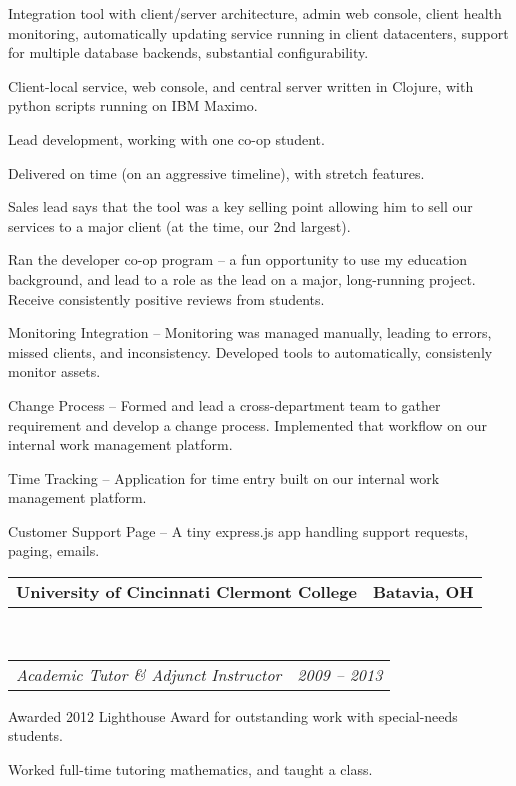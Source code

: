 \documentclass[10pt,letterpaper]{article}
\makeatletter
\newcommand{\headerrow}[2]
{\begin{tabular*}{\linewidth}{l@{\extracolsep{\fill}}r}
	#1 &
	#2 \\
\end{tabular*}}
\makeatother
\begin{document}
\begin{itemize*}
          \begin{itemize*}
          \item Integration tool with client/server architecture, admin web console, client health monitoring, automatically updating service running in client datacenters, support for multiple database backends, substantial configurability.
          \item Client-local service, web console, and central server written in Clojure, with python scripts running on IBM Maximo.
          \item Lead development, working with one co-op student.
          \item Delivered on time (on an aggressive timeline), with stretch features.
          \item Sales lead says that the tool was a key selling point allowing him to sell our services to a major client (at the time, our 2nd largest).
          \end{itemize*}

          \item Ran the developer co-op program -- a fun opportunity to use my education background, and lead to a role as the lead on a major, long-running project.  Receive consistently positive reviews from students.
          \item Monitoring Integration -- Monitoring was managed manually, leading to errors, missed clients, and inconsistency.  Developed tools to automatically, consistenly monitor assets.
          \item Change Process -- Formed and lead a cross-department team to gather requirement and develop a change process.  Implemented that workflow on our internal work management platform.
          \item Time Tracking -- Application for time entry built on our internal work management platform.
          \item Customer Support Page -- A tiny express.js app handling support requests, paging, emails.

	\end{itemize*}
\headerrow
    {\textbf{University of Cincinnati Clermont College}}
    {\textbf{Batavia, OH}}
    \\
    \headerrow
	{\emph{Academic Tutor \& Adjunct Instructor}}
	{\emph{2009 -- 2013}}
	\begin{itemize*}
	\item Awarded 2012 Lighthouse Award for outstanding work with special-needs students.
	\item Worked full-time tutoring mathematics, and taught a class.
	\end{itemize*}
\end{document}
